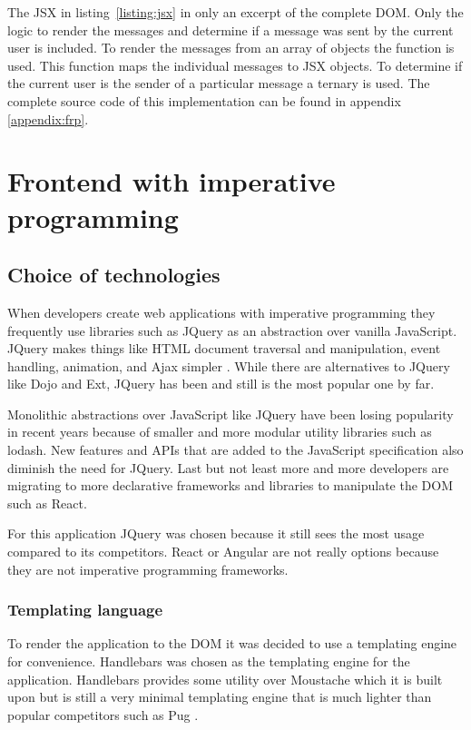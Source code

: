 The JSX in listing~\ref{listing:jsx} in only an excerpt of the complete DOM. Only the logic to render the messages and determine if a message was sent by the current user is included. To render the messages from an array of objects the  function is used. This function maps the individual messages to JSX objects. To determine if the current user is the sender of a particular message a ternary is used. The complete source code of this implementation can be found in appendix \ref{appendix:frp}.

\section{Frontend with imperative programming}
\label{sec:imp-imp}

\subsection{Choice of technologies}

When developers create web applications with imperative programming they frequently use libraries such as JQuery as an abstraction over vanilla JavaScript. JQuery makes things like HTML document traversal and manipulation, event handling, animation, and Ajax simpler \cite{jquery}. While there are alternatives to JQuery like Dojo and Ext, JQuery has been and still is the most popular one by far. 

Monolithic abstractions over JavaScript like JQuery have been losing popularity in recent years because of smaller and more modular utility libraries such as lodash. New features and APIs that are added to the JavaScript specification also diminish the need for JQuery. Last but not least more and more developers are migrating to more declarative frameworks and libraries to manipulate the DOM such as React.

For this application JQuery was chosen because it still sees the most usage compared to its competitors. React or Angular are not really options because they are not imperative programming frameworks.

\subsubsection{Templating language}

To render the application to the DOM it was decided to use a templating engine for convenience. Handlebars was chosen as the templating engine for the application. Handlebars provides some utility over Moustache which it is built upon but is still a very minimal templating engine that is much lighter than popular competitors such as Pug \cite{handlebars}. 

